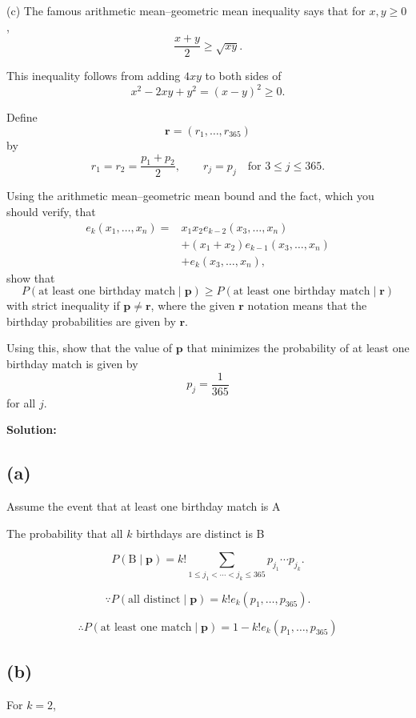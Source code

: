 \documentclass{article}
\begin{document}
\medskip

\noindent
(c) The famous arithmetic mean--geometric mean inequality says that for $x,y\ge 0$,
\[
\frac{x+y}{2}\ge \sqrt{xy}.
\]

This inequality follows from adding $4xy$ to both sides of
\[
x^2-2xy+y^2=(x-y)^2\ge 0.
\]

Define
\[
\mathbf{r}=(r_1,\ldots,r_{365})
\]
by
\[
r_1=r_2=\frac{p_1+p_2}{2},
\qquad
r_j=p_j
\quad\text{for }3\le j\le 365.
\]

Using the arithmetic mean--geometric mean bound and the fact, which you should verify,
that
\[
\begin{aligned}
e_k(x_1,\ldots,x_n)
={}&x_1x_2e_{k-2}(x_3,\ldots,x_n) \\
&+(x_1+x_2)e_{k-1}(x_3,\ldots,x_n) \\
&+e_k(x_3,\ldots,x_n),
\end{aligned}
\]
show that
\[
P(\text{at least one birthday match}\mid \mathbf{p})
\ge
P(\text{at least one birthday match}\mid \mathbf{r})
\]
with strict inequality if $\mathbf{p}\ne\mathbf{r}$, where the given $\mathbf{r}$
notation means that the birthday probabilities are given by $\mathbf{r}$.

Using this, show that the value of $\mathbf{p}$ that minimizes the probability of at
least one birthday match is given by
\[
p_j=\frac{1}{365}
\]
for all $j$.

\bigskip

\noindent\textbf{Solution:}


\subsection*{(a)}
Assume the event that at least one birthday match is A

The probability that all \(k\) birthdays are distinct is B

\[
P(\text{B}\mid \mathbf p)
=
k!
\sum_{1\le j_1<\cdots<j_k\le365}
p_{j_1}\cdots p_{j_k}.
\]

\[
\because
P(\text{all distinct}\mid \mathbf p)
=
k!e_k(p_1,\ldots,p_{365}).
\]

\[
\therefore
P(\text{at least one match}\mid \mathbf p)
=
1-k!e_k(p_1,\ldots,p_{365})
\]

\subsection*{(b)}

For \(k=2\),
\end{document}
